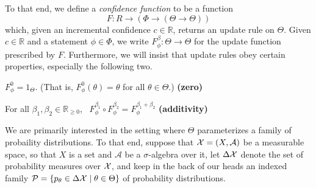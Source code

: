 \documentclass{article}
\begin{document}
To that end, we define a \emph{confidence function} to be a function
\[
    F: R \to ( \Phi \to (\Theta \to \Theta))
\]
which, given an incremental confidence $c \in \mathbb R$, returns an update rule on $\Theta$. 
Given $c \in \mathbb R$ and a statement $\phi \in \Phi$, we write
$F^\beta_\phi : \Theta \to \Theta$
for the update function prescribed by $F$.
Furthermore, we will insist that update rules obey certain properties, especially the following two.
\begin{URaxioms}
    \item  $F^{0}_\phi  = 1_{\Theta}$.
        (That is, $F^{0}_\phi(\theta) = \theta$ for all $\theta \in \Theta$.)
        \hfill \textbf{(zero)} \label{ax:zero}
    \item For all $\beta_1, \beta_2 \in \mathbb R_{\ge 0}$,~
        $F^{\beta_1}_\phi \circ F^{\beta_2}_\phi = F^{\beta_1 + \beta_2}_\phi$
        \hfill \textbf{(additivity)} \label{ax:additivity}
\end{URaxioms}


We are primarily interested in the setting where $\Theta$ parameterizes a family of probaility distributions.
To that end, suppose that $\mathcal X = (X, \mathcal A)$ be a measurable space, so that $X$ is a set and $\mathcal A$ be a $\sigma$-algebra over it, let $\Delta \mathcal X$ denote the set of probability measures over $\mathcal X$,
and keep in the back of our heads an indexed family
$
    \mathcal P =
    \{ p_\theta \in\Delta\mathcal X \mid \theta \in \Theta \}
$ of probability distributions.

%
\end{document}
